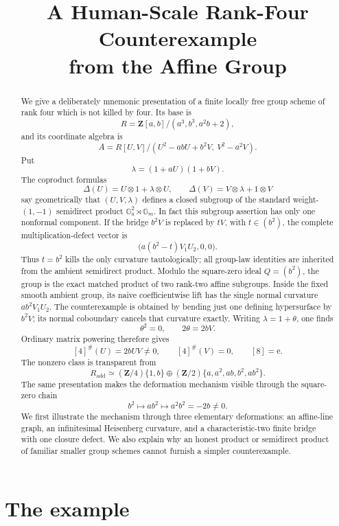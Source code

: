 \documentclass[11pt]{amsart}
\title[A human-scale rank-four counterexample]
      {A Human-Scale Rank-Four Counterexample\\
       from the Affine Group}
\author{}
\date{}
\theoremstyle{definition}
\theoremstyle{remark}
\newcommand{\Z}{\mathbf Z}
\newcommand{\Ga}{\mathbb G_a}
\newcommand{\Gm}{\mathbb G_m}
\newcommand{\ot}{\otimes}
\newcommand{\unit}{\mathrm e}
\begin{document}
\begin{abstract}
We give a deliberately mnemonic presentation of a finite locally free
group scheme of rank four which is not killed by four.  Its base is
\[
 R=\Z[a,b]/(a^3,b^3,a^2b+2),
\]
and its coordinate algebra is
\[
 A=R[U,V]/(U^2-abU+b^2V,\ V^2-a^2V).
\]
Put
\[
 \lambda=(1+aU)(1+bV).
\]
The coproduct formulas
\[
 \Delta(U)=U\ot1+\lambda\ot U,\qquad
 \Delta(V)=V\ot\lambda+1\ot V
\]
say geometrically that \((U,V,\lambda)\) defines a closed subgroup of
the standard weight-\((1,-1)\) semidirect product
\(\Ga^2\rtimes\Gm\).  In fact this subgroup assertion has only one
nonformal component.  If the bridge \(b^2V\) is replaced by \(tV\), with
\(t\in(b^2)\), the complete multiplication-defect vector is
\[
 \bigl(a(b^2-t)V_1U_2,0,0\bigr).
\]
Thus \(t=b^2\) kills the only curvature tautologically; all group-law
identities are inherited from the ambient semidirect product.  Modulo the
square-zero ideal \(Q=(b^2)\), the group is the exact matched product of
two rank-two affine subgroups.  Inside the fixed smooth ambient group,
its naive coefficientwise lift has the single normal curvature
\(ab^2V_1U_2\).  The counterexample is obtained by bending just one
defining hypersurface by \(b^2V\); its normal coboundary cancels that
curvature exactly.
Writing \(\lambda=1+\theta\), one finds
\[
 \theta^2=0,\qquad 2\theta=2bV.
\]
Ordinary matrix powering therefore gives
\[
 [4]^\#(U)=2bUV\ne0,\qquad [4]^\#(V)=0,\qquad [8]=\unit.
\]
The nonzero class is transparent from
\[
 R_{\mathrm{add}}\simeq
 (\Z/4)\{1,b\}\oplus
 (\Z/2)\{a,a^2,ab,b^2,ab^2\}.
\]
The same presentation makes the deformation mechanism visible through
the square-zero chain
\[
 b^2\longmapsto ab^2\longmapsto a^2b^2=-2b\ne0.
\]
We first illustrate the mechanism through three elementary deformations:
an affine-line graph, an infinitesimal Heisenberg curvature, and a
characteristic-two finite bridge with one closure defect.
We also explain why an honest product or semidirect product of familiar
smaller group schemes cannot furnish a simpler counterexample.
\end{abstract}

\maketitle

\section{The example}
\end{document}
